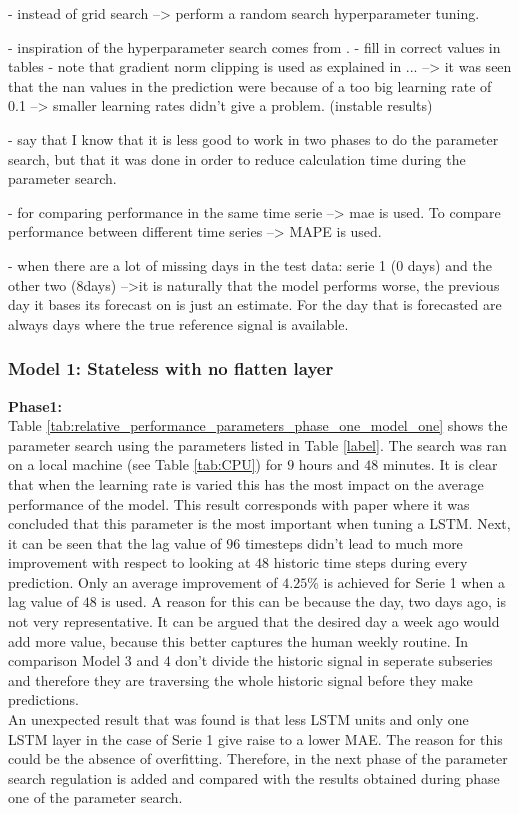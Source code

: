 - instead of grid search --> perform a random search hyperparameter tuning.

- inspiration of the hyperparameter search comes from \cite{Shi2018}.
- fill in correct values in tables
- note that gradient norm clipping is used as explained in ... --> it was seen that the nan values in the prediction were because of a too big learning rate of 0.1 --> smaller learning rates didn't give a problem. (instable results)

- say that I know that it is less good to work in two phases to do the parameter search, but that it was done in order to reduce calculation time during the parameter search. 

- for comparing performance in the same time serie --> mae is used. To compare performance between different time series --> MAPE is used. 

- when there are a lot of missing days in the test data: serie 1 (0 days) and the other two (8days) -->it is naturally that the model performs worse, the previous day it bases its forecast on is just an estimate. For the day that is forecasted are always days where the true reference signal is available. 


\subsubsection{Model 1: Stateless with no flatten layer}



\textbf{Phase1:}\\
Table \ref{tab:relative_performance_parameters_phase_one_model_one} shows the parameter search using the parameters listed in Table \ref{label}. The search was ran on a local machine (see Table \ref{tab:CPU}) for $ 9 $ hours and $ 48 $ minutes. It is clear that when the learning rate is varied this has the most impact on the average performance of the model. This result corresponds with paper \cite{Greff2017a} where it was concluded that this parameter is the most important when tuning a LSTM. Next, it can be seen that the lag value of $ 96 $ timesteps didn't lead to much more improvement with respect to looking at $ 48 $ historic time steps during every prediction. Only an average improvement of $ 4.25 \% $ is achieved for Serie 1 when a lag value of $ 48 $ is used. A reason for this can be because the day, two days ago, is not very representative. It can be argued that the desired day a week ago would add more value, because this better captures the human weekly routine. In comparison Model $ 3 $ and $ 4 $ don't divide the historic signal in seperate subseries and therefore they are traversing the whole historic signal before they make predictions.\\
An unexpected result that was found is that less LSTM units and only one LSTM layer in the case of Serie 1 give raise to a lower MAE. The reason for this could be the absence of overfitting. Therefore, in the next phase of the parameter search regulation is added and compared with the results obtained during phase one of the parameter search. 

